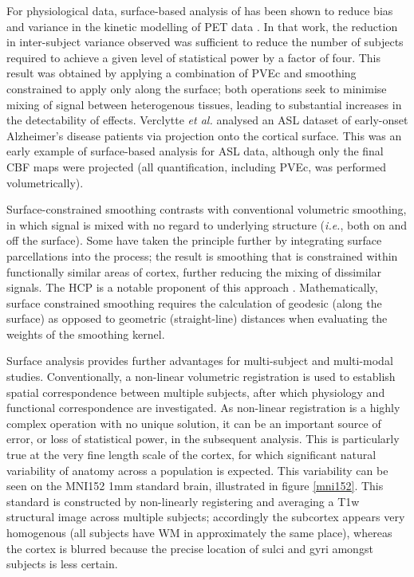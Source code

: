 \documentclass[12pt]{report}
\begin{document}
For physiological data, surface-based analysis of has been shown to reduce bias and variance in the kinetic modelling of PET data \cite{Greve2014}. In that work, the reduction in inter-subject variance observed was sufficient to reduce the number of subjects required to achieve a given level of statistical power by a factor of four. This result was obtained by applying a combination of PVEc and smoothing constrained to apply only along the surface; both operations seek to minimise mixing of signal between heterogenous tissues, leading to substantial increases in the detectability of effects. Verclytte \textit{et al.} \cite{Verclytte2015} analysed an ASL dataset of early-onset Alzheimer's disease patients via projection onto the cortical surface. This was an early example of surface-based analysis for ASL data, although only the final CBF maps were projected (all quantification, including PVEc, was performed volumetrically). 

Surface-constrained smoothing contrasts with conventional volumetric smoothing, in which signal is mixed with no regard to underlying structure (\textit{i.e.}, both on and off the surface). Some have taken the principle further by integrating surface parcellations into the process; the result is smoothing that is constrained within functionally similar areas of cortex, further reducing the mixing of dissimilar signals. The HCP is a notable proponent of this approach \cite{Glasser2013, Coalson2017}. Mathematically, surface constrained smoothing requires the calculation of geodesic (along the surface) as opposed to geometric (straight-line) distances when evaluating the weights of the smoothing kernel. 

Surface analysis provides further advantages for multi-subject and multi-modal studies. Conventionally, a non-linear volumetric registration is used to establish spatial correspondence between multiple subjects, after which physiology and functional correspondence are investigated. As non-linear registration is a highly complex operation with no unique solution, it can be an important source of error, or loss of statistical power, in the subsequent analysis. This is particularly true at the very fine length scale of the cortex, for which significant natural variability of anatomy across a population is expected. This variability can be seen on the MNI152 1mm standard brain, illustrated in figure \ref{mni152}. This standard is constructed by non-linearly registering and averaging a T1w structural image across multiple subjects; accordingly the subcortex appears very homogenous (all subjects have WM in approximately the same place), whereas the cortex is blurred because the precise location of sulci and gyri amongst subjects is less certain. 
\end{document}

